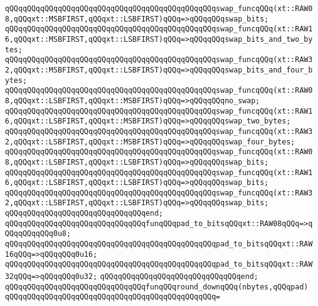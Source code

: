 \verb|qQQqqQQqqQQqqQQqqQQqqQQqqQQqqQQqqQQqqQQqqQQqqQQqswap_funcqQQq(xt::RAW08,qQQqxt::MSBFIRST,qQQqxt::LSBFIRST)qQQq=>qQQqqQQqswap_bits;|\newline
\verb|qQQqqQQqqQQqqQQqqQQqqQQqqQQqqQQqqQQqqQQqqQQqqQQqswap_funcqQQq(xt::RAW16,qQQqxt::MSBFIRST,qQQqxt::LSBFIRST)qQQq=>qQQqqQQqswap_bits_and_two_bytes;|\newline
\verb|qQQqqQQqqQQqqQQqqQQqqQQqqQQqqQQqqQQqqQQqqQQqqQQqswap_funcqQQq(xt::RAW32,qQQqxt::MSBFIRST,qQQqxt::LSBFIRST)qQQq=>qQQqqQQqswap_bits_and_four_bytes;|\newline
\verb|qQQqqQQqqQQqqQQqqQQqqQQqqQQqqQQqqQQqqQQqqQQqqQQqswap_funcqQQq(xt::RAW08,qQQqxt::LSBFIRST,qQQqxt::MSBFIRST)qQQq=>qQQqqQQqno_swap;|\newline
\verb|qQQqqQQqqQQqqQQqqQQqqQQqqQQqqQQqqQQqqQQqqQQqqQQqswap_funcqQQq(xt::RAW16,qQQqxt::LSBFIRST,qQQqxt::MSBFIRST)qQQq=>qQQqqQQqswap_two_bytes;|\newline
\verb|qQQqqQQqqQQqqQQqqQQqqQQqqQQqqQQqqQQqqQQqqQQqqQQqswap_funcqQQq(xt::RAW32,qQQqxt::LSBFIRST,qQQqxt::MSBFIRST)qQQq=>qQQqqQQqswap_four_bytes;|\newline
\verb|qQQqqQQqqQQqqQQqqQQqqQQqqQQqqQQqqQQqqQQqqQQqqQQqswap_funcqQQq(xt::RAW08,qQQqxt::LSBFIRST,qQQqxt::LSBFIRST)qQQq=>qQQqqQQqswap_bits;|\newline
\verb|qQQqqQQqqQQqqQQqqQQqqQQqqQQqqQQqqQQqqQQqqQQqqQQqswap_funcqQQq(xt::RAW16,qQQqxt::LSBFIRST,qQQqxt::LSBFIRST)qQQq=>qQQqqQQqswap_bits;|\newline
\verb|qQQqqQQqqQQqqQQqqQQqqQQqqQQqqQQqqQQqqQQqqQQqqQQqswap_funcqQQq(xt::RAW32,qQQqxt::LSBFIRST,qQQqxt::LSBFIRST)qQQq=>qQQqqQQqswap_bits;|\newline
\verb|qQQqqQQqqQQqqQQqqQQqqQQqqQQqqQQqend;|\newline
\newline
\verb|qQQqqQQqqQQqqQQqqQQqqQQqqQQqqQQqfunqQQqpad_to_bitsqQQqxt::RAW08qQQq=>qQQqqQQqqQQq0u8;|\newline
\verb|qQQqqQQqqQQqqQQqqQQqqQQqqQQqqQQqqQQqqQQqqQQqqQQqpad_to_bitsqQQqxt::RAW16qQQq=>qQQqqQQq0u16;|\newline
\verb|qQQqqQQqqQQqqQQqqQQqqQQqqQQqqQQqqQQqqQQqqQQqqQQqpad_to_bitsqQQqxt::RAW32qQQq=>qQQqqQQq0u32;|\newline
\verb|qQQqqQQqqQQqqQQqqQQqqQQqqQQqqQQqend;|\newline
\newline
\verb|qQQqqQQqqQQqqQQqqQQqqQQqqQQqqQQqfunqQQqround_downqQQq(nbytes,qQQqpad)|\newline
\verb|qQQqqQQqqQQqqQQqqQQqqQQqqQQqqQQqqQQqqQQqqQQqqQQq=|\newline
